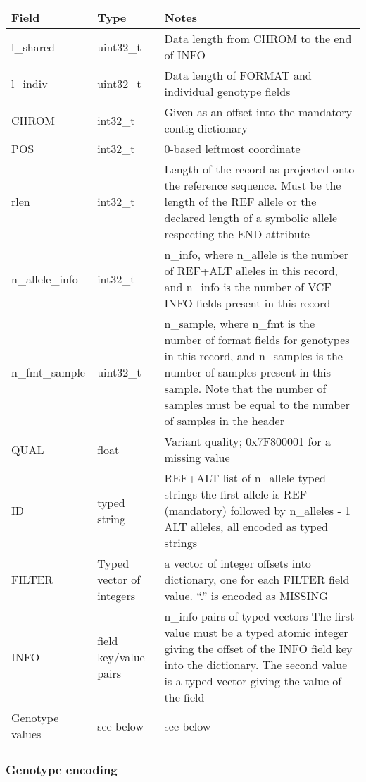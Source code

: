 \documentclass[8pt]{article}
\begin{document}
{\small
\begin{tabular}{|l | l | p{30em} | } \hline
\textbf{Field} &	\textbf{Type} &	\textbf{Notes} \\ \hline
l\_shared &	uint32\_t &	Data length from CHROM to the end of INFO \\ \hline
l\_indiv  &	uint32\_t &	Data length of FORMAT and individual genotype fields \\ \hline
CHROM	  & int32\_t  &	Given as an offset into the mandatory contig dictionary \\ \hline
POS	      & int32\_t  &	0-based leftmost coordinate \\ \hline
rlen      &	int32\_t  &	Length of the record as projected onto the reference sequence. Must be the length of the REF allele or the declared length of a symbolic allele respecting the END attribute \\ \hline
n\_allele\_info	& int32\_t	& n\_info, where n\_allele is the number of REF+ALT alleles in this record, and n\_info is the number of VCF INFO fields present in this record \\ \hline
n\_fmt\_sample	& uint32\_t	& n\_sample, where n\_fmt is the number of format fields for genotypes in this record, and n\_samples is the number of samples present in this sample.  Note that the number of samples must be equal to the number of samples in the header \\ \hline
QUAL	  & float	  & Variant quality; 0x7F800001 for a missing value \\ \hline
ID	      & typed string & REF+ALT	list of n\_allele typed strings	the first allele is REF (mandatory) followed by n\_alleles - 1 ALT alleles, all encoded as typed strings \\ \hline
FILTER	  & Typed vector of integers	& a vector of integer offsets into dictionary, one for each FILTER field value.  ``.'' is encoded as MISSING \\ \hline
INFO      & field key/value pairs	    & n\_info pairs of typed vectors	The first value must be a typed atomic integer giving the offset of the INFO field key into the dictionary.  The second value is a typed vector giving the value of the field \\ \hline
Genotype values &	see below	& see below \\ \hline
\end{tabular}}

\subsubsection{Genotype encoding}
\end{document}
